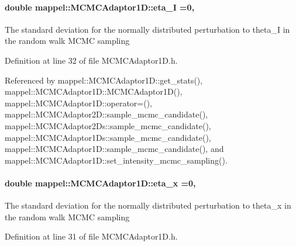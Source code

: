 \paragraph[{\texorpdfstring{eta\+\_\+I}{eta_I}}]{\setlength{\rightskip}{0pt plus 5cm}double mappel\+::\+M\+C\+M\+C\+Adaptor1\+D\+::eta\+\_\+I =0\hspace{0.3cm}{\ttfamily [protected]}, {\ttfamily [inherited]}}\hypertarget{classmappel_1_1MCMCAdaptor1D_a5780d326be0c40e10d6c91777cfffbd3}{}\label{classmappel_1_1MCMCAdaptor1D_a5780d326be0c40e10d6c91777cfffbd3}
The standard deviation for the normally distributed perturbation to theta\+\_\+I in the random walk M\+C\+MC sampling 

Definition at line 32 of file M\+C\+M\+C\+Adaptor1\+D.\+h.



Referenced by mappel\+::\+M\+C\+M\+C\+Adaptor1\+D\+::get\+\_\+stats(), mappel\+::\+M\+C\+M\+C\+Adaptor1\+D\+::\+M\+C\+M\+C\+Adaptor1\+D(), mappel\+::\+M\+C\+M\+C\+Adaptor1\+D\+::operator=(), mappel\+::\+M\+C\+M\+C\+Adaptor2\+D\+::sample\+\_\+mcmc\+\_\+candidate(), mappel\+::\+M\+C\+M\+C\+Adaptor2\+Ds\+::sample\+\_\+mcmc\+\_\+candidate(), mappel\+::\+M\+C\+M\+C\+Adaptor1\+Ds\+::sample\+\_\+mcmc\+\_\+candidate(), mappel\+::\+M\+C\+M\+C\+Adaptor1\+D\+::sample\+\_\+mcmc\+\_\+candidate(), and mappel\+::\+M\+C\+M\+C\+Adaptor1\+D\+::set\+\_\+intensity\+\_\+mcmc\+\_\+sampling().

\paragraph[{\texorpdfstring{eta\+\_\+x}{eta_x}}]{\setlength{\rightskip}{0pt plus 5cm}double mappel\+::\+M\+C\+M\+C\+Adaptor1\+D\+::eta\+\_\+x =0\hspace{0.3cm}{\ttfamily [protected]}, {\ttfamily [inherited]}}\hypertarget{classmappel_1_1MCMCAdaptor1D_ae5787e38c9cef6168acf6fc5d3216693}{}\label{classmappel_1_1MCMCAdaptor1D_ae5787e38c9cef6168acf6fc5d3216693}
The standard deviation for the normally distributed perturbation to theta\+\_\+x in the random walk M\+C\+MC sampling 

Definition at line 31 of file M\+C\+M\+C\+Adaptor1\+D.\+h.



